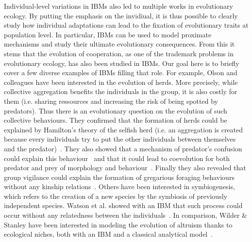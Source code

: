         Individual-level variations in IBMs also led to multiple works in evolutionary ecology. By putting the emphasis on the invidiual, it is thus possible to clearly study how individual adaptations can lead to the fixation of evolutionary traits at population level. In particular, IBMs can be used to model proximate mechanisms and study their ultimate evolutionary consequences. From this it stems that the evolution of cooperation, as one of the trademark problems in evolutionary ecology, has also been studied in IBMs. Our goal here is to briefly cover a few diverse examples of IBMs filling that role. For example, Olson and colleagues have been interested in the evolution of herds. More precisely, while collective aggregation benefits the individuals in the group, it is also costly for them (i.e. sharing ressources and increasing the risk of being spotted by predators). Thus there is an evolutionary question on the evolution of such collective behaviours. They confirmed that the formation of herds could be explained by Hamilton's theory of the selfish herd (i.e. an aggregation is created because every individuals try to put the other individuals between themselves and the predator)~\parencite{Hamilton1971, Olson2013a}. They also showed that a mechanism of predator's confusion could explain this behaviour~\parencite{Olson2013} and that it could lead to coevolution for both predator and prey of morphology and behaviour~\parencite{Olson2016}. Finally they also revealed that group vigilance could explain the formation of gregarious foraging behaviours without any kinship relations~\parencite{Haley2014, Olson2014a}. Others have been interested in symbiogenesis, which refers to the creation of a new species by the symbiosis of previously independent species. Watson et al. showed with an IBM that such process could occur without any relatedness between the individuals~\parencite{Watson1992}. In comparison, Wilder \& Stanley have been interested in modeling the evolution of altruism thanks to ecological niches, both with an IBM and a classical analytical model~\parencite{Wilder2015}.


